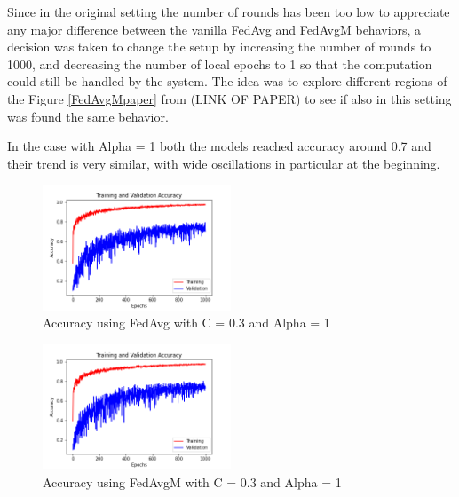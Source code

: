 \documentclass[twocolumn]{article}
\begin{document}
Since in the original setting the number of rounds has been too low to appreciate any major difference between the vanilla FedAvg and FedAvgM behaviors, a decision was taken to change the setup by increasing the number of rounds to 1000, and decreasing the number of local epochs to 1 so that the computation could still be handled by the system.
The idea was to explore different regions of the Figure \ref{FedAvgMpaper} from (LINK OF PAPER) to see if also in this setting was found the same behavior.


In the case with Alpha = 1 both the models reached accuracy around 0.7 and their trend is very similar, with wide oscillations in particular at the beginning.

\begin{figure}
    \centering
    \includegraphics[width=0.5\textwidth,height=.3\textheight]{9_AccuracyFedAvg_C0.3A_1.png}
    \caption{Accuracy using FedAvg with C = 0.3 and Alpha = 1}
     \label{AccFedAvgC0.3A1} 
\end{figure}

\begin{figure}
    \centering
    \includegraphics[width=0.5\textwidth,height=.3\textheight]{9_AccuracyFedAvgM_C0.3A_1.png}
    \caption{Accuracy using FedAvgM with C = 0.3 and Alpha = 1}
     \label{AccFedAvgMC0.3A1} 
\end{figure}
\end{document}
